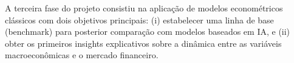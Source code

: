 \documentclass[	12pt, Times, openright, oneside, a4paper, english, brazil]{abntex2}
\begin{document}
A terceira fase do projeto consistiu na aplicação de modelos econométricos clássicos com dois objetivos principais: (i) estabelecer uma linha de base (benchmark) para posterior comparação com modelos baseados em IA, e (ii) obter os primeiros insights explicativos sobre a dinâmica entre as variáveis macroeconômicas e o mercado financeiro.






\end{document}
